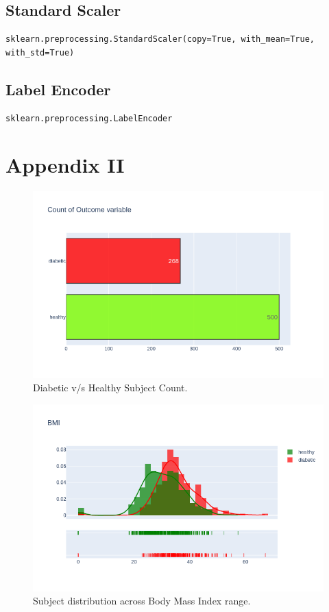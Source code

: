 \documentclass[12pt]{article}
\begin{document}
\subsection{Standard Scaler}
\begin{lstlisting}
sklearn.preprocessing.StandardScaler(copy=True, with_mean=True, with_std=True)
\end{lstlisting}

\subsection{Label Encoder}
\begin{lstlisting}
sklearn.preprocessing.LabelEncoder
\end{lstlisting}

\clearpage
\section{Appendix II}

\begin{figure}[ht]
\centering
\includegraphics[width=1\textwidth]{1.png}
\caption{\label{fig:8} Diabetic v/s Healthy Subject Count.}
\end{figure}

\begin{figure}[ht]
\centering
\includegraphics[width=1\textwidth]{10.png}
\caption{\label{fig:1} Subject distribution across Body Mass Index range.}
\end{figure}
\end{document}
